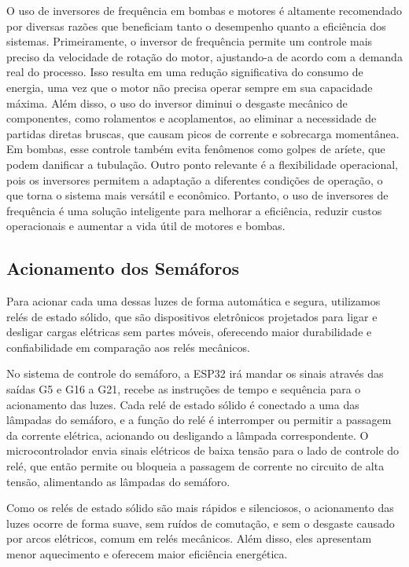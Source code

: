 O uso de inversores de frequência em bombas e motores é altamente recomendado por diversas razões que beneficiam tanto o desempenho quanto a eficiência dos sistemas. Primeiramente, o inversor de frequência permite um controle mais preciso da velocidade de rotação do motor, ajustando-a de acordo com a demanda real do processo. Isso resulta em uma redução significativa do consumo de energia, uma vez que o motor não precisa operar sempre em sua capacidade máxima. Além disso, o uso do inversor diminui o desgaste mecânico de componentes, como rolamentos e acoplamentos, ao eliminar a necessidade de partidas diretas bruscas, que causam picos de corrente e sobrecarga momentânea. Em bombas, esse controle também evita fenômenos como golpes de aríete, que podem danificar a tubulação. Outro ponto relevante é a flexibilidade operacional, pois os inversores permitem a adaptação a diferentes condições de operação, o que torna o sistema mais versátil e econômico. Portanto, o uso de inversores de frequência é uma solução inteligente para melhorar a eficiência, reduzir custos operacionais e aumentar a vida útil de motores e bombas.

\subsection{Acionamento dos Semáforos}

Para acionar cada uma dessas luzes de forma automática e segura, utilizamos relés de estado sólido, que são dispositivos eletrônicos projetados para ligar e desligar cargas elétricas sem partes móveis, oferecendo maior durabilidade e confiabilidade em comparação aos relés mecânicos.

No sistema de controle do semáforo, a ESP32 irá mandar os sinais através das saídas G5 e G16 a G21, recebe as instruções de tempo e sequência para o acionamento das luzes. Cada relé de estado sólido é conectado a uma das lâmpadas do semáforo, e a função do relé é interromper ou permitir a passagem da corrente elétrica, acionando ou desligando a lâmpada correspondente. O microcontrolador envia sinais elétricos de baixa tensão para o lado de controle do relé, que então permite ou bloqueia a passagem de corrente no circuito de alta tensão, alimentando as lâmpadas do semáforo.

Como os relés de estado sólido são mais rápidos e silenciosos, o acionamento das luzes ocorre de forma suave, sem ruídos de comutação, e sem o desgaste causado por arcos elétricos, comum em relés mecânicos. Além disso, eles apresentam menor aquecimento e oferecem maior eficiência energética. 